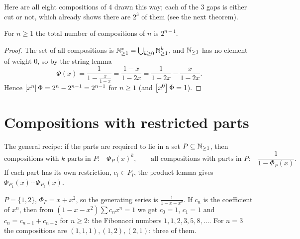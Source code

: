 Here are all eight compositions of $4$ drawn this way; each of the $3$ gaps is either cut or
not, which already shows there are $2^{3}$ of them (see the next theorem).
\begin{center}
\end{center}

\begin{theorem}
For $n \ge 1$ the total number of compositions of $n$ is $2^{n-1}$.
\end{theorem}
\begin{proof}
The set of all compositions is $\mathbb{N}_{\ge1}^* = \bigcup_{k\ge0}\mathbb{N}_{\ge1}^k$, and $\mathbb{N}_{\ge1}$ has no
element of weight $0$, so by the string lemma
\[
\Phi(x) = \frac{1}{1 - \frac{x}{1-x}} = \frac{1-x}{1-2x} = \frac{1}{1-2x} - \frac{x}{1-2x}.
\]
Hence $\left[x^{n}\right]\Phi = 2^n - 2^{n-1} = 2^{n-1}$ for $n \ge 1$ (and $\left[x^{0}\right]\Phi = 1$).
\end{proof}

\section{Compositions with restricted parts}

The general recipe: if the parts are required to lie in a set $P \subseteq \mathbb{N}_{\ge1}$, then
\[
\text{compositions with $k$ parts in $P$:}\quad \Phi_P(x)^k,
\qquad \text{all compositions with parts in $P$:}\quad \frac{1}{1 - \Phi_P(x)}.
\]
If each part has its own restriction, $c_i \in P_i$, the product lemma gives
$\Phi_{P_1}(x)\cdots\Phi_{P_k}(x)$.

\begin{example}
$P = \{1,2\}$, $\Phi_P = x + x^2$, so the generating series is $\frac{1}{1 - x - x^2}$. If $c_n$
is the coefficient of $x^n$, then from $(1-x-x^2)\sum c_nx^n = 1$ we get $c_0 = 1$, $c_1 = 1$
and $c_n = c_{n-1} + c_{n-2}$ for $n \ge 2$: the Fibonacci numbers $1, 1, 2, 3, 5, 8, \dots$.
For $n = 3$ the compositions are $(1,1,1),(1,2),(2,1)$: three of them.
\end{example}

